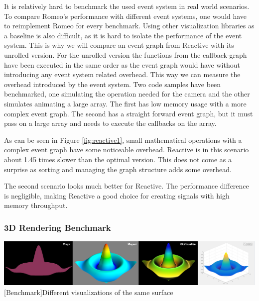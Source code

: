 It is relatively hard to benchmark the used event system in real world scenarios. To compare Romeo's performance with different event systems, one would have to reimplement Romeo for every benchmark.
Using other visualization libraries as a baseline is also difficult, as it is hard to isolate the performance of the event system.
This is why we will compare an event graph from Reactive with its unrolled version.
For the unrolled version the functions from the callback-graph have been executed in the same order as the event graph would have without introducing any event system related overhead.
This way we can measure the overhead introduced by the event system.
Two code samples have been benchmarked, one simulating the operation needed for the camera and the other simulates animating a large array.
The first has low memory usage with a more complex event graph. The second has a straight forward event graph, but it must pass on a large array and needs to execute the callbacks on the array.

As can be seen in Figure \ref{fig:reactive1}, small mathematical operations with a complex event graph have some noticeable overhead. Reactive is in this scenario about 1.45 times slower than the optimal version.
This does not come as a surprise as sorting and managing the graph structure adds some overhead.

The second scenario looks much better for Reactive. The performance difference is negligible, making Reactive a good choice for creating signals with high memory throughput.

\subsubsection{3D Rendering Benchmark}

\begin{minipage}{\linewidth}
    \centering
    \includegraphics[width=\linewidth]{graphics/vispy_mayavi_romeo.jpg}
    [Benchmark]{Different visualizations of the same surface}
    \label{fig:reactive1}
\end{minipage}

